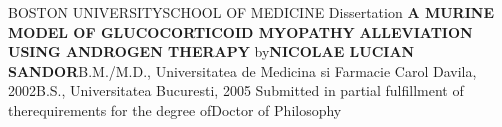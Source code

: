 \documentclass[12pt,english]{report}\usepackage[]{graphicx}\usepackage[]{color}
\begin{document}
\begin{singlespace}
\noindent \begin{center}
 BOSTON UNIVERSITY\linebreak\linebreak SCHOOL
OF MEDICINE\linebreak \linebreak \linebreak \linebreak \linebreak
Dissertation \linebreak \linebreak \linebreak \linebreak \linebreak \linebreak
\textbf{A MURINE MODEL OF GLUCOCORTICOID MYOPATHY }\linebreak \linebreak\textbf{ALLEVIATION
USING ANDROGEN THERAPY}\linebreak \linebreak \linebreak \linebreak \linebreak
by\linebreak \linebreak \linebreak \linebreak \linebreak \textbf{NICOLAE
LUCIAN SANDOR}\linebreak B.M./M.D., Universitatea de Medicina si
Farmacie Carol Davila, 2002\linebreak B.S., Universitatea Bucuresti,
2005\linebreak \linebreak \linebreak \linebreak \linebreak \linebreak \linebreak \linebreak
Submitted in partial fulfillment of the\linebreak \linebreak requirements
for the degree of\linebreak \linebreak Doctor of Philosophy\linebreak {}
\par\end{center}
\end{singlespace}
\end{document}
